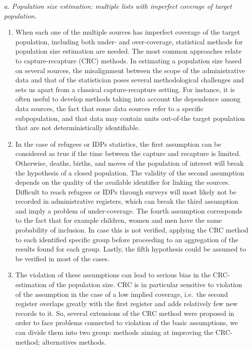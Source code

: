 \documentclass[
]{article}
\begin{document}
\emph{a. Population size estimation: multiple lists with imperfect coverage
of target population.}

\begin{enumerate}
\def\labelenumi{\arabic{enumi}.}
\setcounter{enumi}{236}
\item
  When each one of the multiple sources has imperfect coverage of the
  target population, including both under- and over-coverage,
  statistical methods for population size estimation are needed. The
  most common approaches relate to capture-recapture (CRC) methods. In
  estimating a population size based on several sources, the
  misalignment between the scope of the administrative data and that
  of the statistician poses several methodological challenges and sets
  us apart from a classical capture-recapture setting. For instance,
  it is often useful to develop methods taking into account the
  dependence among data sources, the fact that some data sources refer
  to a specific subpopulation, and that data may contain units
  out-of-the target population that are not deterministically
  identifiable.
\item
  In the case of refugees or IDPs statistics, the first assumption
  can be considered as true if the time between the capture and
  recapture is limited. Otherwise, deaths, births, and moves of the
  population of interest will break the hypothesis of a closed
  population. The validity of the second assumption depends on the
  quality of the available identifier for linking the sources.
  Difficult to reach refugees or IDPs through surveys will most likely
  not be recorded in administrative registers, which can break the
  third assumption and imply a problem of under-coverage. The fourth
  assumption corresponds to the fact that for example children, women
  and men have the same probability of inclusion. In case this is not
  verified, applying the CRC method to each identified specific group
  before proceeding to an aggregation of the results found for each
  group. Lastly, the fifth hypothesis could be assumed to be verified
  in most of the cases.
\item
  The violation of these assumptions can lead to serious bias in the
  CRC-estimation of the population size. CRC is in particular
  sensitive to violation of the assumption in the case of a low
  implied coverage, i.e.~the second register overlaps greatly with the
  first register and adds relatively few new records to it. So,
  several extensions of the CRC method were proposed in order to face
  problems connected to violation of the basic assumptions, we can
  divide them into two group: methods aiming at improving the
  CRC-method; alternatives methods.
\end{enumerate}
\end{document}
